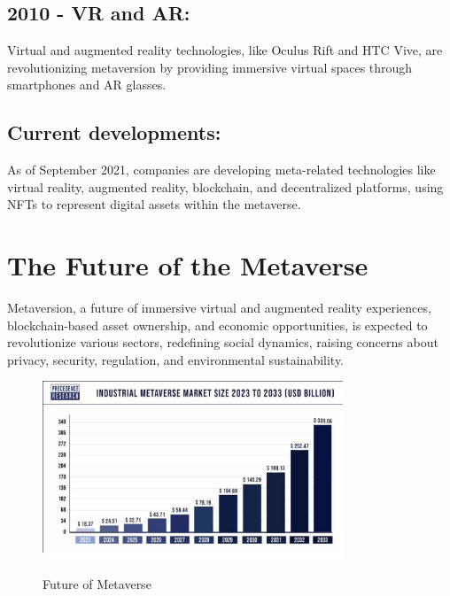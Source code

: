 \subsection{2010 - VR and AR:}
Virtual and augmented reality technologies, like Oculus Rift and HTC Vive, are revolutionizing metaversion by providing immersive virtual spaces through smartphones and AR glasses.

\subsection{Current developments:}
As of September 2021, companies are developing meta-related technologies like virtual reality, augmented reality, blockchain, and decentralized platforms, using NFTs to represent digital assets within the metaverse.
\section{The Future of the Metaverse}
Metaversion, a future of immersive virtual and augmented reality experiences, blockchain-based asset ownership, and economic opportunities, is expected to revolutionize various sectors, redefining social dynamics, raising concerns about privacy, security, regulation, and environmental sustainability.
\begin{figure}[h]
    \centering
    \includegraphics[width=0.8\textwidth, height=0.35\textheight]{Images/industrial-metaverse-market-size.png}
    \caption{Future of Metaverse}
    \label{fig:Future of Metaverse}\cite{metaverse-market}
\end{figure}
